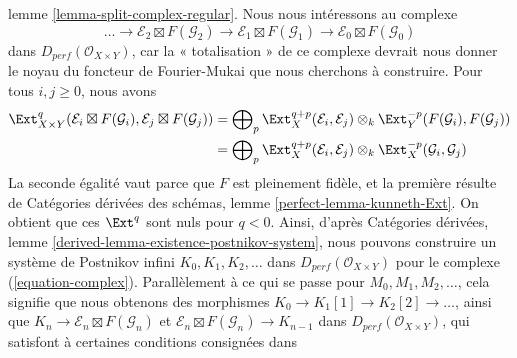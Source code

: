 lemme \ref{lemma-split-complex-regular}.
\medskip\noindent
Nous nous intéressons au complexe
\begin{equation}
\label{equation-complex}
\ldots \to
\mathcal{E}_2 \boxtimes F(\mathcal{G}_2) \to
\mathcal{E}_1 \boxtimes F(\mathcal{G}_1) \to
\mathcal{E}_0 \boxtimes F(\mathcal{G}_0)
\end{equation}
dans $D_{perf}(\mathcal{O}_{X \times Y})$,
car la « totalisation » de ce complexe devrait
nous donner le noyau du foncteur de Fourier-Mukai que nous cherchons à construire.
Pour tous $i, j \geq 0$, nous avons
\begin{align*}
\Ext^q_{X \times Y}(\mathcal{E}_i \boxtimes F(\mathcal{G}_i),
\mathcal{E}_j \boxtimes F(\mathcal{G}_j))
& =
\bigoplus\nolimits_p
\Ext^{q + p}_X(\mathcal{E}_i, \mathcal{E}_j) \otimes_k
\Ext^{-p}_Y(F(\mathcal{G}_i), F(\mathcal{G}_j)) \\
& =
\bigoplus\nolimits_p
\Ext^{q + p}_X(\mathcal{E}_i, \mathcal{E}_j) \otimes_k
\Ext^{-p}_X(\mathcal{G}_i, \mathcal{G}_j)
\end{align*}
La seconde égalité vaut parce que $F$ est pleinement fidèle, et la première
résulte de Catégories dérivées des schémas, lemme
\ref{perfect-lemma-kunneth-Ext}.
On obtient que ces $\Ext^q$ sont nuls pour $q < 0$.
Ainsi, d'après Catégories dérivées, lemme
\ref{derived-lemma-existence-postnikov-system},
nous pouvons construire un système de Postnikov infini $K_0, K_1, K_2, \ldots$
dans $D_{perf}(\mathcal{O}_{X \times Y})$ pour le complexe
(\ref{equation-complex}).
Parallèlement à ce qui se passe pour $M_0, M_1, M_2, \ldots$, cela signifie
que nous obtenons des morphismes
$K_0 \to K_1[1] \to K_2[2] \to \ldots$, ainsi que
$K_n \to \mathcal{E}_n \boxtimes F(\mathcal{G}_n)$ et
$\mathcal{E}_n \boxtimes F(\mathcal{G}_n) \to K_{n - 1}$
dans $D_{perf}(\mathcal{O}_{X \times Y})$,
qui satisfont à certaines conditions consignées dans

